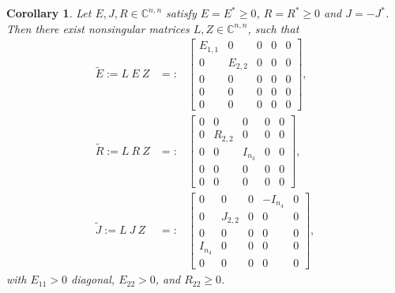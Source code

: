 \documentclass[11pt]{article}
\newtheorem{corollary}[theorem]{Corollary}
\def\eproof{\space
        {\ \vbox{\hrule\hbox{\vrule height1.3ex\hskip0.8ex\vrule}\hrule}}
        \bigskip}
\begin{document}
\begin{corollary}\label{cor:almostkcf}
Let $E,J,R\in\mathbb C^{n,n}$ satisfy $E=E^*\geq 0$, $R=R^*\geq 0$ and $J=-J^*$.
Then there exist nonsingular matrices  $L,Z\in\mathbb C^{n,n}$, such that
%
\begin{eqnarray}
\tilde E :=L\ E\ Z
&=:&\begin{bmatrix}
E_{1,1} & 0& 0 & 0 & 0 \\
0&  E_{2,2}& 0 & 0 & 0 \\
0  & 0 & 0 & 0 & 0 \\
0  & 0 & 0 & 0 & 0 \\
0  & 0 & 0 & 0 & 0
\end{bmatrix}, \nonumber\\
%
\tilde R :=L\ R\ Z
&=:&\begin{bmatrix}
0 & 0 & 0& 0 & 0 \\
0 & R_{2,2}& 0 &0 & 0  \\
0 & 0 & I_{n_3} &0 & 0 \\
0  & 0 & 0 & 0 & 0 \\
0  & 0 & 0 & 0 & 0
\end{bmatrix}, \label{kronecker:EJR} \\
%
\tilde J :=L\ J\ Z
&=:&\begin{bmatrix}
0 & 0 & 0 & -I_{n_4} & 0\\
0 & J_{2,2} & 0& 0 & 0\\
0& 0 & 0&  0 & 0\\
I_{n_4} & 0& 0 & 0 &0\\
 0 & 0 & 0 & 0 & 0
\end{bmatrix},
\nonumber
\end{eqnarray}
with $E_{11}>0$ diagonal, $E_{22}>0$, and $R_{22}\geq 0$.
\end{corollary}
\end{document}
